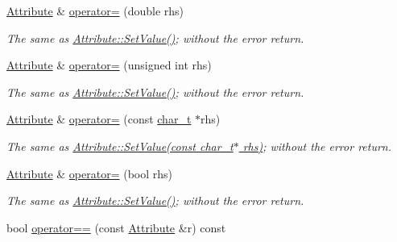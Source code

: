 \begin{DoxyCompactItemize}
\hyperlink{classMezzanine_1_1xml_1_1Attribute}{Attribute} \& \hyperlink{classMezzanine_1_1xml_1_1Attribute_aa4a83209cff8a1fcab19c825db642e1c}{operator=} (double rhs)
\begin{DoxyCompactList}\small\item\em The same as \hyperlink{classMezzanine_1_1xml_1_1Attribute_a850c7d6692ac542ea197952c734e3800}{Attribute::SetValue()}; without the error return. \item\end{DoxyCompactList}\item 
\hyperlink{classMezzanine_1_1xml_1_1Attribute}{Attribute} \& \hyperlink{classMezzanine_1_1xml_1_1Attribute_a726b6a41f4791c2a879bb564eceabf31}{operator=} (unsigned int rhs)
\begin{DoxyCompactList}\small\item\em The same as \hyperlink{classMezzanine_1_1xml_1_1Attribute_a850c7d6692ac542ea197952c734e3800}{Attribute::SetValue()}; without the error return. \item\end{DoxyCompactList}\item 
\hyperlink{classMezzanine_1_1xml_1_1Attribute}{Attribute} \& \hyperlink{classMezzanine_1_1xml_1_1Attribute_af196575d6ca9e8d229283230e0ce4dcb}{operator=} (const \hyperlink{namespaceMezzanine_1_1xml_a29b8a47c179e9895c4e9e66c45d1dbbc}{char\_\-t} $\ast$rhs)
\begin{DoxyCompactList}\small\item\em The same as \hyperlink{classMezzanine_1_1xml_1_1Attribute_a850c7d6692ac542ea197952c734e3800}{Attribute::SetValue(const char\_\-t$\ast$ rhs)}; without the error return. \item\end{DoxyCompactList}\item 
\hyperlink{classMezzanine_1_1xml_1_1Attribute}{Attribute} \& \hyperlink{classMezzanine_1_1xml_1_1Attribute_a2b4fc316431150dcfdd0ac20426ce973}{operator=} (bool rhs)
\begin{DoxyCompactList}\small\item\em The same as \hyperlink{classMezzanine_1_1xml_1_1Attribute_a850c7d6692ac542ea197952c734e3800}{Attribute::SetValue()}; without the error return. \item\end{DoxyCompactList}\item 
bool \hyperlink{classMezzanine_1_1xml_1_1Attribute_a730aabb87fd861852ba861246bdca85f}{operator==} (const \hyperlink{classMezzanine_1_1xml_1_1Attribute}{Attribute} \&r) const 

\end{DoxyCompactItemize}
